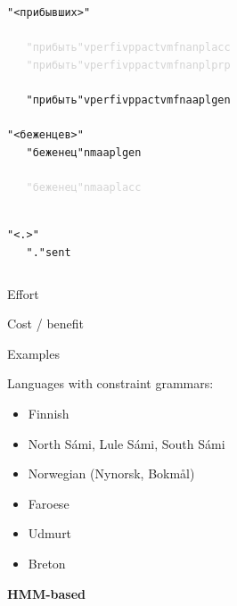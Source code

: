 \documentclass{beamer}
\begin{document}
\begin{frame}
\begin{columns}
\begin{tiny}
\begin{alltt}
~\\
"<прибывших>"\\
\textcolor{lightgray}{
~~~"прибыть" v perf iv pp actv mfn an pl acc  \\
~~~"прибыть" v perf iv pp actv mfn an pl prp \\
}
~~~"прибыть" v perf iv pp actv mfn aa pl gen
~\\
"<беженцев>"\\
~~~"беженец" n m aa pl gen\\
\textcolor{lightgray}{
~~~"беженец" n m aa pl acc
}

~\\
"<.>"\\
~~~"." sent
\end{alltt}
\end{tiny}
\end{columns}

\end{frame}


\begin{frame}{Effort}


\end{frame}

\begin{frame}{Cost / benefit}

%

% 


\end{frame}

\begin{frame}{Examples}

Languages with constraint grammars:
\begin{itemize}
  \item Finnish
  \item North Sámi, Lule Sámi, South Sámi
  \item Norwegian (Nynorsk, Bokmål)
  \item Faroese
  \item Udmurt
  \item Breton
\end{itemize}

\end{frame}


\begin{frame}
\centering
{\LARGE {\bf HMM-based } }
\end{frame}
\end{document}
